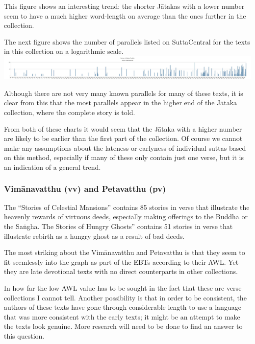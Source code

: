 \medskip
This figure shows an interesting trend: the shorter Jātakas with a lower number seem to have a much higher word-length on average than the ones further in the collection. 

The next figure shows the number of parallels listed on SuttaCentral for the texts in this collection on a logarithmic scale. \\

\includegraphics[width=\linewidth]{jatakapars.jpg}
\label{jatakapars}

\medskip
Although there are not very many known parallels for many of these texts, it is clear from this that the most parallels appear in the higher end of the Jātaka collection, where the complete story is told.

From both of these charts it would seem that the Jātaka with a higher number are likely to be earlier than the first part of the collection. Of course we cannot make any assumptions about the lateness or earlyness of individual suttas based on this method, especially if many of these only contain just one verse, but it is an indication of a general trend.

\subsubsection{Vimānavatthu (vv) and Petavatthu (pv)}
The “Stories of Celestial Mansions” contains 85 stories in verse that illustrate the heavenly rewards of virtuous deeds, especially making offerings to the Buddha or the Saṅgha. The Stories of Hungry Ghosts” contains 51 stories in verse that illustrate rebirth as a hungry ghost as a result of bad deeds.

The most striking about the Vimānavatthu and Petavatthu is that they seem to fit seemlessly into the graph as part of the EBTs according to their AWL. Yet they are late devotional texts with no direct counterparts in other collections.

In how far the low AWL value has to be sought in the fact that these are verse collections I cannot tell. Another possibility is that in order to be consistent, the authors of these texts have gone through considerable length to use a language that was more consistent with the early texts; it might be an attempt to make the texts look genuine. More research will need to be done to find an answer to this question.

